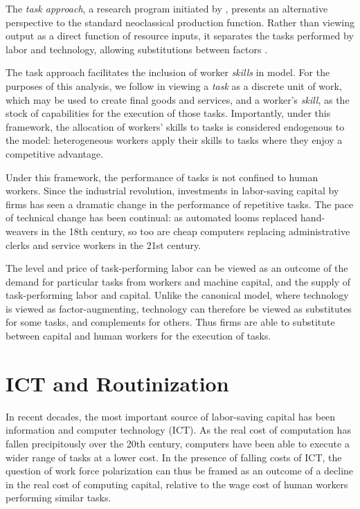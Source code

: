 
The {\em task approach}, a research program initiated by \citet{Levy2003}, presents an alternative perspective to the standard neoclassical production function. Rather than viewing output as a direct function of resource inputs, it separates the tasks performed by labor and technology, allowing  substitutions between factors \citep{Autor2013,Acemoglu2011}. 

The task approach facilitates the inclusion of worker \emph{skills} in model. For the purposes of this analysis, we follow \citet{Autor2013} in viewing a \emph{task} as a discrete unit of work, which may be used to create final goods and services, and a worker's \emph{skill}, as the stock of capabilities for the execution of those tasks. Importantly, under this framework, the allocation of workers' skills to tasks is considered endogenous to the model: heterogeneous workers apply their skills to tasks where they enjoy a competitive advantage.

Under this framework, the performance of tasks is not confined to human workers. Since the industrial revolution, investments in labor-saving capital by firms has seen a dramatic change in the performance of repetitive tasks. The pace of technical change has been continual: as automated looms replaced hand-weavers in the 18th century, so too are cheap computers replacing administrative clerks and service workers in the 21st century.

The level and price of task-performing labor can be 
viewed as an outcome of the demand for particular tasks from workers and machine capital, and the supply of task-performing labor and capital. Unlike the canonical model, where technology is viewed as factor-augmenting,  technology can therefore be viewed as substitutes for some tasks, and complements for others. Thus firms are able to substitute between capital and human workers for the execution of tasks.

\section{ICT and Routinization}

In recent decades, the most important source of labor-saving capital has been information and computer technology (ICT). As the real cost of computation has fallen precipitously over the 20th century, computers have been able to execute a wider range of tasks at a lower cost. In the presence of falling costs of ICT, the question of work force polarization can thus be framed as an outcome of a decline in the real cost of computing capital, relative to the wage cost of human workers performing similar tasks.

